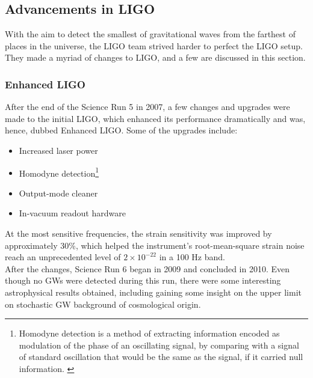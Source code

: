 \subsection{Advancements in LIGO}
With the aim to detect the smallest of gravitational waves from the farthest of places in the universe, the LIGO team strived harder to perfect the LIGO setup. They made a myriad of changes to LIGO, and a few are discussed in this section.

\subsubsection{Enhanced LIGO}
After the end of the Science Run 5 in 2007, a few changes and upgrades were made to the initial LIGO, which enhanced its performance dramatically and was, hence, dubbed Enhanced LIGO. Some of the upgrades include:
\begin{itemize}
\item Increased laser power

\item Homodyne detection\footnote{Homodyne detection is a method of extracting information encoded as modulation of the phase of an oscillating signal, by comparing with a signal of standard oscillation that would be the same as the signal, if it carried null information. \cite{Homodyne}}

\item Output-mode cleaner

\item In-vacuum readout hardware
\end{itemize}
At the most sensitive frequencies, the strain sensitivity was improved by approximately 30\%, which helped the instrument's root-mean-square strain noise reach an unprecedented level of $2\times 10^{-22}$ in a 100 Hz band.\cite{Adv_LIGO_Paper}\\
After the changes, Science Run 6 began in 2009 and concluded in 2010. Even though no GWs were detected during this run, there were some interesting astrophysical results obtained, including gaining some insight on the upper limit on stochastic GW background of cosmological origin. \cite{Adv_LIGO}

